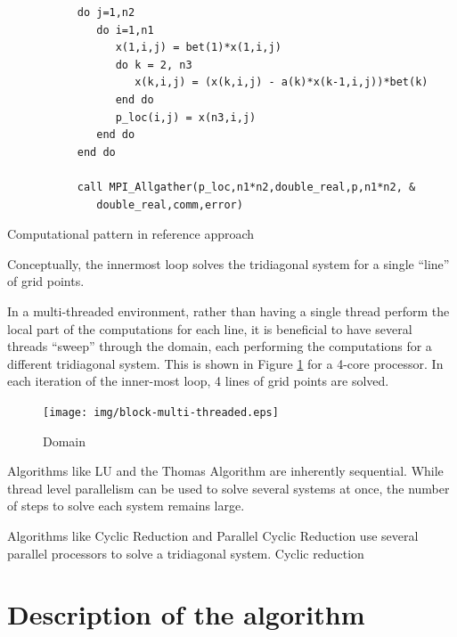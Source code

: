 \documentclass{article}
\begin{document}
        \begin{listing}
        \begin{verbatim}
           do j=1,n2
              do i=1,n1
                 x(1,i,j) = bet(1)*x(1,i,j)
                 do k = 2, n3
                    x(k,i,j) = (x(k,i,j) - a(k)*x(k-1,i,j))*bet(k)
                 end do
                 p_loc(i,j) = x(n3,i,j)
              end do
           end do

           call MPI_Allgather(p_loc,n1*n2,double_real,p,n1*n2, &
              double_real,comm,error)

        \end{verbatim}
        \caption{Computational pattern in reference approach}
        \end{listing}

        Conceptually, the innermost loop solves the tridiagonal system
        for a single ``line'' of grid points.

        In a multi-threaded environment,
        rather than having a single thread perform the local part
        of the computations for each line,
        it is beneficial to have several threads ``sweep'' through the domain,
        each performing the computations for a different tridiagonal system.
        This is shown in Figure \ref{fig:block-multi-threaded} for a 4-core processor.
        In each iteration of the inner-most loop,
        4 lines of grid points are solved.

        \begin{figure}[h]
        \begin{center}
        \texttt{[image: img/block-multi-threaded.eps]}
        \end{center}
        \caption{Domain}
        \label{fig:block-multi-threaded}
        \end{figure}

        Algorithms like LU and the Thomas Algorithm are inherently sequential.
        While thread level parallelism can be used to solve several systems at once,
        the number of steps to solve each system remains large.

        Algorithms like Cyclic Reduction and Parallel Cyclic Reduction use
        several parallel processors to solve a tridiagonal system.
        Cyclic reduction

\section{Description of the algorithm}
\end{document}

